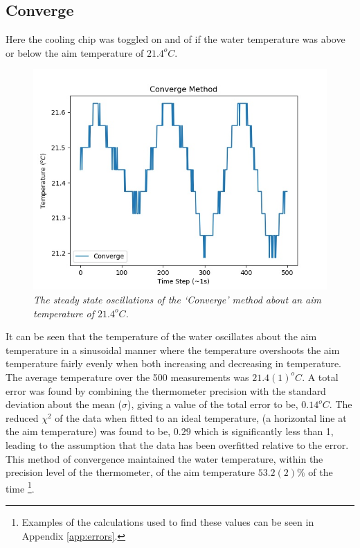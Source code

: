 \documentclass[10pt]{article}
\begin{document}
\subsection*{Converge}
Here the cooling chip was toggled on and of if the water temperature was above or below the aim temperature of $21.4^oC$. \\

\begin{figure}[h!]
    \centering
    \includegraphics[scale=0.75]{converge.jpg}
    \caption{\it{The steady state oscillations of the `Converge' method about an aim temperature of $21.4^oC$.}}
    \label{fig:conv}
\end{figure}

It can be seen that the temperature of the water oscillates about the aim temperature in a sinusoidal manner where the temperature overshoots the aim temperature fairly evenly when both increasing and decreasing in temperature. \\

The average temperature over the 500 measurements was $21.4(1)^oC$. A total error was found by combining the thermometer precision with the standard deviation about the mean ($\sigma$), giving a value of the total error to be, $0.14^oC$. The reduced $\chi^2$ of the data when fitted to an ideal temperature, (a horizontal line at the aim temperature) was found to be, $0.29$ which is significantly less than 1, leading to the assumption that the data has been overfitted relative to the error. This method of convergence maintained the water temperature, within the precision level of the thermometer, of the aim temperature $53.2(2)\%$ of the time \footnote{Examples of the calculations used to find these values can be seen in Appendix \ref{app:errors}.}.\\
\end{document}
